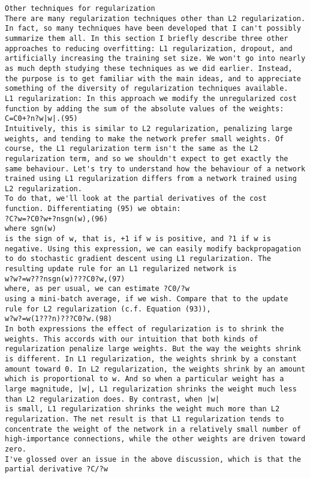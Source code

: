 \begin{lstlisting}
Other techniques for regularization
There are many regularization techniques other than L2 regularization. In fact, so many techniques have been developed that I can't possibly summarize them all. In this section I briefly describe three other approaches to reducing overfitting: L1 regularization, dropout, and artificially increasing the training set size. We won't go into nearly as much depth studying these techniques as we did earlier. Instead, the purpose is to get familiar with the main ideas, and to appreciate something of the diversity of regularization techniques available.
L1 regularization: In this approach we modify the unregularized cost function by adding the sum of the absolute values of the weights:
C=C0+?n?w|w|.(95)
Intuitively, this is similar to L2 regularization, penalizing large weights, and tending to make the network prefer small weights. Of course, the L1 regularization term isn't the same as the L2 regularization term, and so we shouldn't expect to get exactly the same behaviour. Let's try to understand how the behaviour of a network trained using L1 regularization differs from a network trained using L2 regularization.
To do that, we'll look at the partial derivatives of the cost function. Differentiating (95) we obtain: 
?C?w=?C0?w+?nsgn(w),(96)
where sgn(w)
is the sign of w, that is, +1 if w is positive, and ?1 if w is negative. Using this expression, we can easily modify backpropagation to do stochastic gradient descent using L1 regularization. The resulting update rule for an L1 regularized network is 
w?w?=w???nsgn(w)???C0?w,(97)
where, as per usual, we can estimate ?C0/?w
using a mini-batch average, if we wish. Compare that to the update rule for L2 regularization (c.f. Equation (93)), 
w?w?=w(1???n)???C0?w.(98)
In both expressions the effect of regularization is to shrink the weights. This accords with our intuition that both kinds of regularization penalize large weights. But the way the weights shrink is different. In L1 regularization, the weights shrink by a constant amount toward 0. In L2 regularization, the weights shrink by an amount which is proportional to w. And so when a particular weight has a large magnitude, |w|, L1 regularization shrinks the weight much less than L2 regularization does. By contrast, when |w|
is small, L1 regularization shrinks the weight much more than L2 regularization. The net result is that L1 regularization tends to concentrate the weight of the network in a relatively small number of high-importance connections, while the other weights are driven toward zero.
I've glossed over an issue in the above discussion, which is that the partial derivative ?C/?w

\end{lstlisting}
